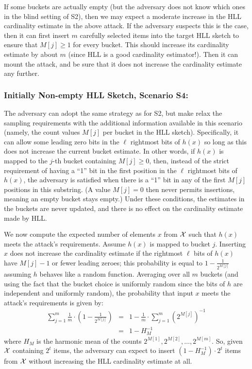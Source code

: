 \documentclass{article}
\begin{document}
If some buckets are actually empty (but the adversary does not know which ones in the blind setting of S2), then we may expect a moderate increase in the HLL cardinality estimate in the above attack. If the adversary suspects this is the case, then it can first insert $m$ carefully selected items into the target HLL sketch to ensure that $M[j] \ge 1$ for every bucket. This should increase its cardinality estimate by about $m$ (since HLL is a good cardinality estimator!). Then it can mount the attack, and be sure that it does not increase the cardinality estimate any further.

\subsubsection{Initially Non-empty HLL Sketch, Scenario S4:}\label{sec:nonemptyHLLS4}
The adversary can adopt the same strategy as for S2, but make relax the sampling requirements with the additional information available in this scenario (namely, the count values $M[j]$ per bucket in the HLL sketch). Specifically, it can allow some leading zero bits in the $\ell$ rightmost bits of $h(x)$ so long as this does not increase the current bucket estimate. In other words, if $h(x)$ is mapped to the $j$-th bucket containing $M[j] \ge 0$, then, instead of the strict requirement of having a ``1'' bit in the first position in the $\ell$ rightmost bits of $h(x)$, the adversary is satisfied when there is a ``1'' bit in any of the first $M[j]$ positions in this substring. (A value $M[j]=0$ then never permits insertions, meaning an empty bucket stays empty.) Under these conditions, the estimates in the buckets are never updated, and there is no effect on the cardinality estimate made by HLL.

We now compute the expected number of elements $x$ from ${\cal X}$ such that $h(x)$ meets the attack's requirements.  %
Assume $h(x)$ is mapped to bucket $j$. Inserting $x$ does not increase the cardinality estimate if the rightmost $\ell$ bits of $h(x)$ have $M[j]-1$ or fewer leading zeroes; this probability is equal to $1-\frac{1}{2^{M[j]}}$ assuming $h$ behaves like a random function. Averaging over all $m$ buckets (and using the fact that the bucket choice is uniformly random since the bits of $h$ are independent and uniformly random), the probability that input $x$ meets the attack's requirements is given by:
\begin{eqnarray*}
\sum_{j=1}^{m}\frac{1}{m} \cdot (1-\frac{1}{2^{M[j]}}) & = & 1- \frac{1}{m}\cdot \sum_{j=1}^{m} {(2^{M[j]})}^{-1} \\
& = &1 - H_M^{-1} 
\end{eqnarray*}
where $H_M$ is the harmonic mean of the counts $2^{M[1]}, 2^{M[2]}, \ldots, 2^{M[m]}$.
So, given ${\cal X}$ containing $2^t$ items, the adversary can expect to insert $(1 - H_M^{-1}) \cdot 2^t$ items from ${\cal X}$ without increasing the HLL cardinality estimate at all.
\end{document}
